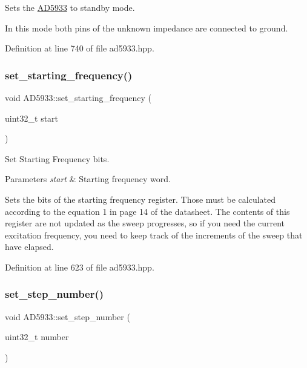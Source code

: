 Sets the \mbox{\hyperlink{struct_a_d5933}{A\+D5933}} to standby mode. 

In this mode both pins of the unknown impedance are connected to ground. 

Definition at line 740 of file ad5933.\+hpp.

\mbox{\label{struct_a_d5933_ad90d16efcaf008887ff6cb995832671e}} 
\subsubsection{\texorpdfstring{set\+\_\+starting\+\_\+frequency()}{set\_starting\_frequency()}}
{\footnotesize\ttfamily void A\+D5933\+::set\+\_\+starting\+\_\+frequency (\begin{DoxyParamCaption}\item[{uint32\+\_\+t}]{start }\end{DoxyParamCaption})}



Set Starting Frequency bits. 


\begin{DoxyParams}{Parameters}
{\em start} & Starting frequency word.\\
\hline
\end{DoxyParams}
Sets the bits of the starting frequency register. Those must be calculated according to the equation 1 in page 14 of the datasheet. The contents of this register are not updated as the sweep progresses, so if you need the current excitation frequency, you need to keep track of the increments of the sweep that have elapsed. 

Definition at line 623 of file ad5933.\+hpp.

\mbox{\label{struct_a_d5933_a81d597ac151fbe62080ecd28d8b87ebb}} 
\subsubsection{\texorpdfstring{set\+\_\+step\+\_\+number()}{set\_step\_number()}}
{\footnotesize\ttfamily void A\+D5933\+::set\+\_\+step\+\_\+number (\begin{DoxyParamCaption}\item[{uint32\+\_\+t}]{number }\end{DoxyParamCaption})}



